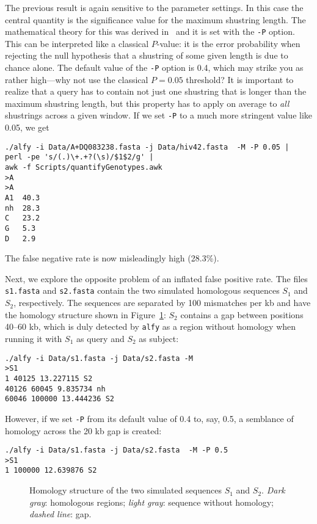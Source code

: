 \documentclass{article}
\newcommand{\I}{\item}
\newcommand{\ty}{\texttt}
\begin{document}
\I The previous result is again sensitive to the parameter settings. In this case the central quantity is the significance value
for the maximum shustring length. The mathematical theory for this was derived in~\cite{hau09:est}
and it is set with the \ty{-P} option. This can be interpreted like a
classical $P$-value: it is the error probability when rejecting the
null hypothesis that a shustring of some given length is due to chance
alone. The default value of the \ty{-P} option is 0.4, which
may strike you as rather high---why not use the classical $P=0.05$
threshold? It is important to realize that a query has to
contain not just one shustring that is longer than the maximum
shustring length, but this property has to apply on average to
\textit{all} shustrings across a given window. If we set \ty{-P} to a
much more stringent value like 0.05, we get
\begin{verbatim}
./alfy -i Data/A+DQ083238.fasta -j Data/hiv42.fasta  -M -P 0.05 | 
perl -pe 's/(.)\+.+?(\s)/$1$2/g' | 
awk -f Scripts/quantifyGenotypes.awk
>A
>A
A1	40.3
nh	28.3
C	23.2
G	5.3
D	2.9
\end{verbatim}
The false negative rate is now misleadingly high (28.3\%).
\I Next, we explore the opposite problem of an inflated false positive
rate. The files \ty{s1.fasta} and \ty{s2.fasta} contain the two
simulated homologous sequences $S_1$ and $S_2$, respectively. The sequences are
separated by 100 mismatches per kb and have the homology structure
shown in Figure~\ref{fig:hom}: $S_2$ contains a gap between positions
40--60 kb, which is duly detected by \ty{alfy} as a region without homology when
running it with $S_1$ as query and $S_2$ as subject:
\begin{verbatim}
./alfy -i Data/s1.fasta -j Data/s2.fasta -M
>S1
1 40125 13.227115 S2
40126 60045 9.835734 nh
60046 100000 13.444236 S2
\end{verbatim}
However, if we set \ty{-P} from its default value of 0.4 to, say, 0.5,
a semblance of homology across the 20 kb gap is created:
\begin{verbatim}
./alfy -i Data/s1.fasta -j Data/s2.fasta  -M -P 0.5
>S1
1 100000 12.639876 S2
\end{verbatim}
\begin{figure}
\begin{center}

\end{center}
\caption{Homology structure of the two simulated sequences $S_1$ and
  $S_2$. \textit{Dark gray}: homologous regions; \textit{light gray}:
  sequence without homology; \textit{dashed line}: gap.}\label{fig:hom}
\end{figure}
\end{document}
